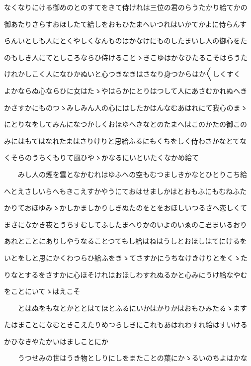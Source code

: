 \documentclass[a4paper,11pt,landscape]{ltjtarticle}
\begin{document}
\par\medskip
なくなりにける御めのとのすてをきて侍けれは三位の君のらうたかり給てかの
\par\medskip
御あたりさらすおほしたて給しをおもひたまへいつれはいかてかよに侍らんす
\par\medskip
らんいとしも人にとくやしくなんものはかなけにものしたまいし人の御心をた
\par\medskip
のもしき人にてとしころならひ侍けることゝきこゆはかなひたるこそはらうた
\par\medskip
けれかしこく人になひかぬいと心つきなきはさなり身つからはか〱しくすく
\par\medskip
よかならぬ心ならひに女はたゝやはらかにとりはつして人にあさむかれぬへき
\par\medskip
かさすかにものつゝみしみん人の心にはしたかはんなむあはれにて我心のまゝ
\par\medskip
にとりなをしてみんになつかしくおほゆへきなとのたまへはこのかたの御この
\par\medskip
みにはもてはなれたまはさりけりと思給ふるにもくちをしく侍わさかなとてな
\par\medskip
くそらのうちくもりて風ひやゝかなるにいといたくなかめ給て
\par\medskip
　　みし人の煙を雲となかむれはゆふへの空もむつましきかなとひとりこち給
\par\medskip
へとえさしいらへもきこえすかやうにておはせましかはとおもふにもむねふた
\par\medskip
かりておほゆみゝかしかましかりしきぬたのをとをおほしいつるさへ恋しくて
\par\medskip
まさになかき夜とうちすむしてふしたまへりかのいよのいゑのこ君まいるおり
\par\medskip
あれとことにありしやうなることつてもし給はねはうしとおほしはてにけるを
\par\medskip
いとをしと思にかくわつらひ給ふをきゝてさすかにうちなけきけりとをくゝた
\par\medskip
りなとするをさすかに心ほそけれはおほしわすれぬるかと心みにうけ給なやむ
\par\medskip
をことにいてゝはえこそ
\par\medskip
　　とはぬをもなとかととはてほとふるにいかはかりかはおもひみたるゝます
\par\medskip
たはまことになむときこえたりめつらしきにこれもあはれわすれ給はすいける
\par\medskip
かひなきやたかいはましことにか
\par\medskip
　　うつせみの世はうき物としりにしをまたことの葉にかゝるいのちよはかな
\end{document}
